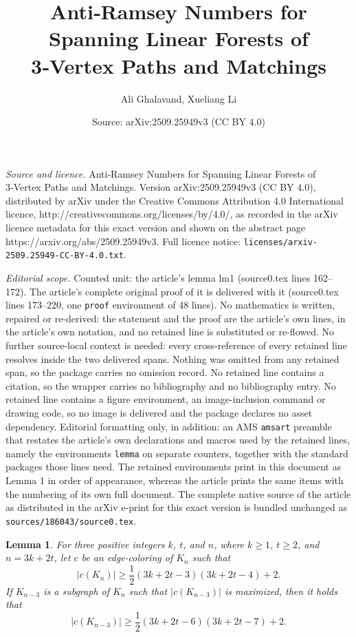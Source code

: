 \documentclass[10pt,a4paper]{amsart}
\title{Anti‑Ramsey Numbers for Spanning Linear Forests of 3‑Vertex Paths and Matchings}
\author{Ali Ghalavand, Xueliang Li}
\date{Source: arXiv:2509.25949v3 (CC BY 4.0)}
\newtheorem{lemma}{Lemma}
\begin{document}
\maketitle

\noindent\emph{Source and licence.} Anti‑Ramsey Numbers for Spanning Linear Forests of 3‑Vertex Paths and Matchings. Version arXiv:2509.25949v3 (CC BY 4.0), distributed by arXiv under the Creative Commons Attribution 4.0 International licence, http://creativecommons.org/licenses/by/4.0/, as recorded in the arXiv licence metadata for this exact version and shown on the abstract page https://arxiv.org/abs/2509.25949v3. Full licence notice: \texttt{licenses/arxiv-2509.25949-CC-BY-4.0.txt}.\par\smallskip

\noindent\textit{Editorial scope.} Counted unit: the article's lemma lm1 (source0.tex lines 162--172). The article's complete original proof of it is delivered with it (source0.tex lines 173--220, one \texttt{proof} environment of 48 lines). No mathematics is written, repaired or re-derived: the statement and the proof are the article's own lines, in the article's own notation, and no retained line is substituted or re-flowed.  No further source-local context is needed: every cross-reference of every retained line resolves inside the two delivered spans.  Nothing was omitted from any retained span, so the package carries no omission record.  No retained line contains a citation, so the wrapper carries no bibliography and no bibliography entry.  No retained line contains a figure environment, an image-inclusion command or drawing code, so no image is delivered and the package declares no asset dependency.  Editorial formatting only, in addition: an AMS \texttt{amsart} preamble that restates the article's own declarations and macros used by the retained lines, namely the environments \texttt{lemma} on separate counters, together with the standard packages those lines need.  The retained environments print in this document as Lemma 1 in order of appearance, whereas the article prints the same items with the numbering of its own full document.  The complete native source of the article as distributed in the arXiv e-print for this exact version is bundled unchanged as \texttt{sources/186043/source0.tex}.
\begin{lemma}\label{lm1}
For three positive integers \( k \), \( t \), and \( n \), where $k\geq1$, \(t \geq 2\), and \(n = 3k + 2t\), let \( c \) be an edge-coloring of \( K_n \) such that 
\[
|c(K_n)| \geq \frac{1}{2} (3k + 2t - 3)(3k + 2t - 4) + 2.
\]
If \( K_{n-3} \) is a subgraph of \( K_n \) such that 
$|c(K_{n-3})|$ is maximized, then it holds that
\[
|c(K_{n-3})| \geq \frac{1}{2}(3k + 2t - 6)(3k + 2t - 7) + 2.
\]
\end{lemma}
\end{document}
